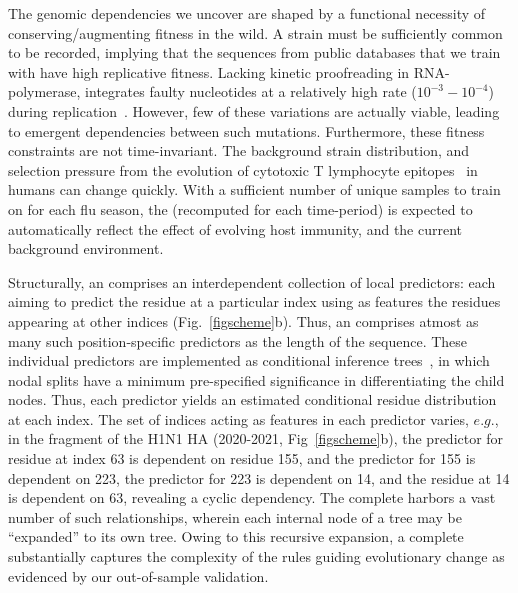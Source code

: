 \documentclass[onecolumn, compsoc,10pt]{IEEEtran}
\begin{document}
The genomic dependencies we uncover are shaped by  a  functional necessity of conserving/augmenting  fitness in the wild. A  strain must be sufficiently common  to be recorded, implying that the sequences from public databases that we train  with have  high replicative fitness. Lacking kinetic proofreading  in  RNA-polymerase,  \infl integrates  faulty nucleotides   at a relatively high rate ($10^{-3}-10^{-4}$) during  replication~\cite{ahlquist2002rna,chen2006avian}. However, few   of these variations are actually viable, %
leading to emergent dependencies between such mutations. Furthermore, these fitness constraints are not time-invariant. The background strain distribution, and selection pressure from the evolution of cytotoxic T lymphocyte  epitopes~\cite{woolthuis2016long,fan2012role,van2016differential,berkhoff2007assessment,van2012evasion} in humans can change quickly. With a sufficient number of unique samples to train on for each flu season, the \enet (recomputed for each time-period) is expected to automatically reflect the effect of evolving host immunity, and the current background environment.  

Structurally, an \enet comprises an interdependent collection of  local predictors: each aiming to predict the  residue at a particular index  using as features  the residues appearing  at other  indices  (Fig.~\ref{figscheme}b). Thus,  an \enet comprises atmost as many such  position-specific predictors as the length of the sequence. These individual predictors are implemented as conditional inference trees~\cite{Hothorn06unbiasedrecursive}, in which  nodal splits  have  a minimum pre-specified significance in differentiating the  child nodes. Thus, each predictor %
yields an estimated conditional residue distribution  at each index. The set of indices acting as features in each predictor varies, $e.g.$, in the fragment of the  H1N1 HA \enet (2020-2021, Fig~\ref{figscheme}b), the predictor for residue at index 63 is dependent on   residue  155, and the predictor for  155 is dependent on  223, the predictor for  223 is dependent on  14, and the residue at  14 is dependent on  63, revealing a cyclic dependency. The complete \enet harbors a vast number of such  relationships, wherein each internal node of a tree may be  ``expanded'' to its own tree. Owing to this recursive expansion,  a complete \enet %
substantially captures the complexity of the rules guiding evolutionary change %
as evidenced by our out-of-sample validation.
\end{document}
